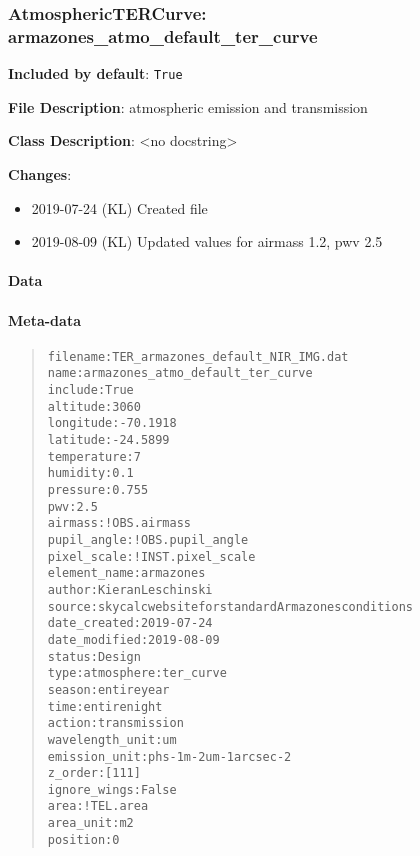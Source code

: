 \documentclass[a4paper]{article}
\begin{document}
\subsubsection{AtmosphericTERCurve: \textquotedbl{}armazones\_atmo\_default\_ter\_curve\textquotedbl{}%
  \label{atmospherictercurve-armazones-atmo-default-ter-curve}%
}

\textbf{Included by default}: \texttt{True}

\textbf{File Description}: atmospheric emission and transmission

\textbf{Class Description}: <no docstring>

\textbf{Changes}:

\begin{itemize}
\item 2019-07-24 (KL) Created file

\item 2019-08-09 (KL) Updated values for airmass 1.2, pwv 2.5
\end{itemize}


\paragraph{Data%
  \label{data}%
}


\paragraph{Meta-data%
  \label{meta-data}%
}

\begin{quote}
\begin{alltt}
       filename : TER_armazones_default_NIR_IMG.dat
           name : armazones_atmo_default_ter_curve
        include : True
       altitude : 3060
      longitude : -70.1918
       latitude : -24.5899
    temperature : 7
       humidity : 0.1
       pressure : 0.755
            pwv : 2.5
        airmass : !OBS.airmass
    pupil_angle : !OBS.pupil_angle
    pixel_scale : !INST.pixel_scale
   element_name : armazones
         author : Kieran Leschinski
         source : skycalc website for standard Armazones conditions
   date_created : 2019-07-24
  date_modified : 2019-08-09
         status : Design
           type : atmosphere:ter_curve
         season : entire year
           time : entire night
         action : transmission
wavelength_unit : um
  emission_unit : ph s-1 m-2 um-1 arcsec-2
        z_order : [111]
   ignore_wings : False
           area : !TEL.area
      area_unit : m2
       position : 0
\end{alltt}
\end{quote}
\end{document}
